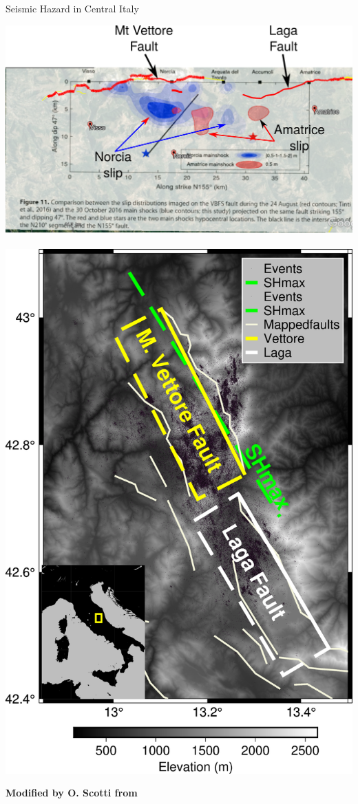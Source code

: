 \documentclass{beamer}
\begin{document}
\begin{frame}
 {Seismic Hazard in Central Italy}

 \begin{center}
  \includegraphics[width=0.65\linewidth]{images/amatrice_3.pdf} \,
  \includegraphics[width=0.3\linewidth]{images/map_italy.png}  
 \end{center}
  \vskip 0.2cm
  {\bf \hfill \scriptsize Modified by O. Scotti from \cite{Scognamiglio_2018_CFG}}
  \addtocounter{framenumber}{-1}
  
\end{frame}
\end{document}
